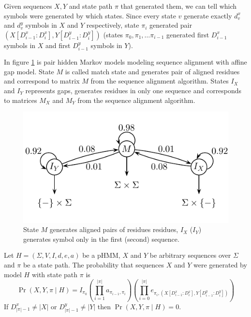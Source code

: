 Given sequences $X,Y$ and state path $\pi$ that generated them, we 
can tell which symbols were generated by which states. Since every state $v$
generate exactly $d^x_v$ and $d^y_v$ symbols in $X$ and $Y$ respectively,
state $\pi_i$ generated pair $(X[D^x_{i-1}:D^x_{i}],Y[D^y_{i-1}:D^y_{i}])$
(states $\pi_0,\pi_1,\dots\pi_{i-1}$ generated first $D^x_{i-1}$ symbols in $X$
and first $D^y_{i-1}$ symbols in $Y$). 


\begin{example}
In figure \ref{FIGURE:EXAMPLEPAIRHMM} is pair hidden Markov models modeling
sequence alignment with affine gap model. State $M$ is called match state and
generates pair of aligned residues and correspond to matrix $M$ from the sequence
alignment algorithm. States $I_X$ and $I_Y$ represents gaps,
generates residues in only one sequence and corresponds to matrices $M_X$ and
$M_Y$ from the sequence alignment algorithm. 
\begin{figure}
\begin{center}
\includegraphics{../figures/simplePairHMM.pdf}
\end{center}
\caption[Example of pair hidden Markov model.]{
State $M$ generates aligned pairs of residues residues, $I_X$ ($I_Y$) generates
symbol only in the first (second) sequence.
}\label{FIGURE:EXAMPLEPAIRHMM}
\end{figure}
\end{example}

\begin{definition}
Let $H=(\Sigma,V,I,d,e,a)$ be  a pHMM, $X$ and $Y$ be arbitrary sequences over
$\Sigma$ and $\pi$ be a state path. The probability that sequences $X$ and $Y$
were generated by model $H$  with state path $\pi$ is
\begin{equation}
\Pr\left(X,Y,\pi\mid H\right)=
I_{\pi_0}
\left(
	\prod_{i=1}^{|\pi|}a_{\pi_{i-1},\pi_i}
\right)
\left(
	\prod_{i=0}^{|\pi|}e_{\pi_i,(X[D^x_{i-1}:D^x_{i}],Y[D^y_{i-1}:D^y_{i}])}
\right)
\end{equation}
If $D^x_{|\pi|-1}\not=|X|$ or $D^y_{|\pi|-1}\not=|Y|$ then
$\Pr\left(X,Y,\pi\mid H\right)=0$. 
\end{definition}

